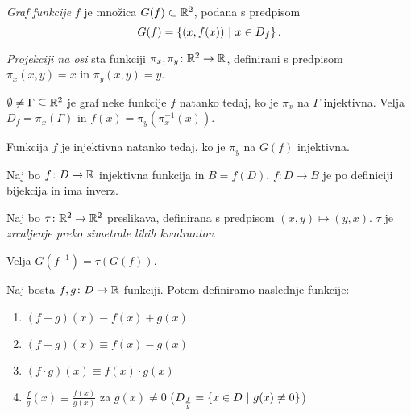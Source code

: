 \documentclass[12pt, a4paper]{article}
\begin{document}
\begin{definicija}
\emph{Graf funkcije} $f$ je množica $G(f)\subset\mathbb{R}^2$, podana s predpisom
\[
G(f)=\left\{(x,f(x))~\middle\vert~x\in D_f\right\}.
\]
\end{definicija}

\begin{definicija}
\emph{Projekciji na osi} sta funkciji $\pi_x,\pi_y\colon \mathbb{R}^2\to\mathbb{R}$, definirani s predpisom $\pi_x(x,y)=x$ in $\pi_y(x,y)=y$.
\end{definicija}

\begin{trditev}
$\emptyset\ne\Gamma\subseteq\mathbb{R}^2$ je graf neke funkcije $f$ natanko tedaj, ko je $\pi_x$ na $\Gamma$ injektivna. Velja $D_f=\pi_x(\Gamma)$ in $f(x)=\pi_y(\pi_x^{-1}(x)).$
\end{trditev}

\begin{trditev}
Funkcija $f$ je injektivna natanko tedaj, ko je $\pi_y$ na $G(f)$ injektivna.
\end{trditev}

\begin{trditev}
Naj bo $f\colon D\to\mathbb{R}$ injektivna funkcija in $B=f(D)$. $f\colon D\to B$ je po definiciji bijekcija in ima inverz.
\end{trditev}

\begin{definicija}
Naj bo $\tau\colon\mathbb{R}^2\to\mathbb{R}^2$ preslikava, definirana s predpisom $(x,y)\mapsto(y,x)$. $\tau$ je \emph{zrcaljenje preko simetrale lihih kvadrantov}.
\end{definicija}

\begin{trditev}
Velja $G(f^{-1})=\tau(G(f))$.
\end{trditev}

\begin{definicija}
Naj bosta $f, g\colon D\to\mathbb{R}$ funkciji. Potem definiramo naslednje funkcije:

\begin{enumerate}[label=\roman*)]
\item $(f+g)(x)\equiv f(x)+g(x)$
\item $(f-g)(x)\equiv f(x)-g(x)$
\item $(f\cdot g)(x)\equiv f(x)\cdot g(x)$
\item $\frac{f}{g}(x)\equiv \frac{f(x)}{g(x)}$ za $g(x)\ne 0$ ($D_{\frac{f}{g}}=\left\{x\in D~\middle\vert~g(x)\ne 0\right\}$)
\end{enumerate}
\end{definicija}
\end{document}
